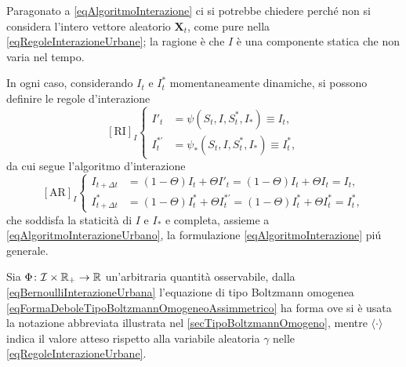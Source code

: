                 \begin{oss}
                    Paragonato a \ref{eqAlgoritmoInterazione} ci si potrebbe chiedere perché non si considera l'intero vettore aleatorio \(\mathbf X_t\), come pure nella \ref{eqRegoleInterazioneUrbane}; la ragione è che \(I\) è una componente statica che non varia nel tempo.
                
                    In ogni caso, considerando \(I_t\) e \(I^*_t\) momentaneamente dinamiche, si possono definire le regole d'interazione
                    \[
                        [\text{RI}]_I\left\{
                        \begin{aligned}
                            I'_t&=\psi(S_t,I,S^*_t,I_*)\equiv I_t,\\
                            I^{*\prime}_t&=\psi_*(S_t,I,S^*_t,I_*)\equiv I_t^*,
                        \end{aligned}\right.
                    \]
                    da cui segue l'algoritmo d'interazione
                    \[
                        [\text{AR}]_I\left\{
                        \begin{aligned}
                            I_{t+\Delta t}&=(1-\Theta)I_t+\Theta I'_t=(1-\Theta)I_t+\Theta I_t=I_t,\\
                            I^*_{t+\Delta t}&=(1-\Theta)I^*_t+\Theta I^{*\prime}_t=(1-\Theta)I^*_t+\Theta I^*_t=I^*_t,
                        \end{aligned}\right.
                    \]
                    che soddisfa la staticità di \(I\) e \(I_*\) e completa, assieme a \ref{eqAlgoritmoInterazioneUrbano}, la formulazione \ref{eqAlgoritmoInterazione} piú generale.
                \end{oss}

                Sia \(\Phi\colon\mathcal I\times\mathbb R_+\to\mathbb R\) un'arbitraria quantità osservabile, dalla \ref{eqBernoulliInterazioneUrbana} l'equazione di tipo Boltzmann omogenea \ref{eqFormaDeboleTipoBoltzmannOmogeneoAssimmetrico} ha forma
                ove si è usata la notazione abbreviata illustrata nel \cref{secTipoBoltzmannOmogeno}, mentre \(\langle\cdot\rangle\) indica il valore atteso rispetto alla variabile aleatoria \(\gamma\) nelle \ref{eqRegoleInterazioneUrbane}.


